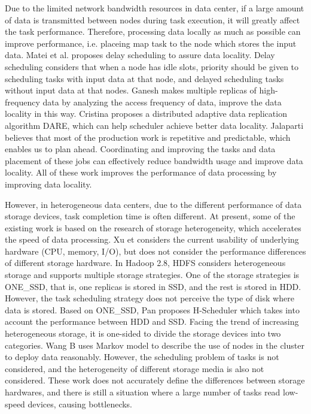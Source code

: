\documentclass[conference]{IEEEtran}
\begin{document}
Due to the limited network bandwidth resources in data center, if a large amount of data is transmitted between nodes during task execution, it will greatly affect the task performance. Therefore, processing data locally as much as possible can improve performance, i.e. placeing map task to the node which stores the input data. Matei et al. \cite{b2} proposes delay scheduling to assure data locality. Delay scheduling considers that when a node has idle slots, priority should be given to scheduling tasks with input data at that node, and delayed scheduling tasks without input data at that nodes. Ganesh \cite{b3} makes multiple replicas of high-frequency data by analyzing the access frequency of data, improve the data locality in this way. Cristina \cite{b4} proposes a distributed adaptive data replication algorithm DARE, which can help scheduler achieve better data locality. Jalaparti \cite{b5} believes that most of the production work is repetitive and predictable, which enables us to plan ahead. Coordinating and improving the tasks and data placement of these jobs can effectively reduce bandwidth usage and improve data locality. All of these work improves the performance of data processing by improving data locality.

However, in heterogeneous data centers, due to the different performance of data storage devices, task completion time is often different. At present, some of the existing work is based on the research of storage heterogeneity, which accelerates the speed of data processing. Xu et \cite{b6} considers the current usability of underlying hardware (CPU, memory, I/O), but does not consider the performance differences of different storage hardware. 
In Hadoop 2.8, HDFS\cite{b19} considers heterogeneous storage and supports multiple storage strategies. One of the storage strategies is ONE\_SSD, that is, one replicas is stored in SSD, and the rest is stored in HDD. However, the task scheduling strategy does not perceive the type of disk where data is stored.
Based on ONE\_SSD, Pan \cite{b7} proposes H-Scheduler which takes into account the performance between HDD and SSD. Facing the trend of increasing heterogeneous storage, it is one-sided to divide the storage devices into two categories. Wang B \cite{b8} uses Markov model to describe the use of nodes in the cluster to deploy data reasonably. However, the scheduling problem of tasks is not considered, and the heterogeneity of different storage media is also not considered. These work does not accurately define the differences between storage hardwares, and there is still a situation where a large number of tasks read low-speed devices, causing bottlenecks.
\end{document}

